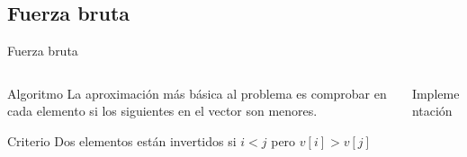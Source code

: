 \subsection{Fuerza bruta}
\begin{frame}{Fuerza bruta}
	\begin{columns}
		
		\begin{column}{4cm}
		\begin{block}{Algoritmo}
		La aproximación más básica al problema es comprobar en cada elemento si los siguientes en el vector son menores.\\
		\end{block}	
		
		\begin{block}{Criterio}
		Dos elementos están invertidos si $i < j$ pero $v[i] > v[j]$\\
		\end{block}	
		\end{column}
		\pause
			
		\begin{column}{6.5cm}
		\begin{exampleblock}{Implementación}
		
		\end{exampleblock}
		\end{column}
		
	\end{columns}
\end{frame}

